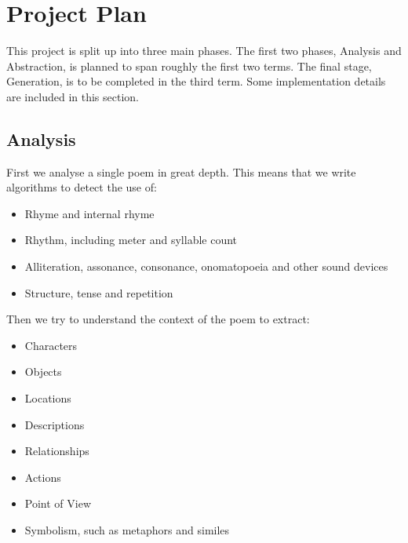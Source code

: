 \def\baselinestretch{1}
\chapter{Project Plan}
\ifpdf
    \graphicspath{{Theory/TheoryFigs/PNG/}{Theory/TheoryFigs/PDF/}{Theory/TheoryFigs/}}
\else
    \graphicspath{{Theory/TheoryFigs/EPS/}{Theory/TheoryFigs/}}
\fi

\def\baselinestretch{1.66}

This project is split up into three main phases. The first two phases, Analysis and Abstraction, is planned to span roughly the first two terms. The final stage, Generation, is to be completed in the third term. Some implementation details are included in this section.
\section{Analysis}

First we analyse a single poem in great depth. This means that we write algorithms to detect the use of:
\begin{itemize}
\setlength{\itemsep}{0pt}
\item{Rhyme and internal rhyme}
\item{Rhythm, including meter and syllable count}
\item{Alliteration, assonance, consonance, onomatopoeia and other sound devices}
\item{Structure, tense and repetition}
\end{itemize}

Then we try to understand the context of the poem to extract:
\begin{itemize}
\setlength{\itemsep}{0pt}
\item{Characters}
\item{Objects}
\item{Locations}
\item{Descriptions}
\item{Relationships}
\item{Actions}
\item{Point of View}
\item{Symbolism, such as metaphors and similes}
\end{itemize}

